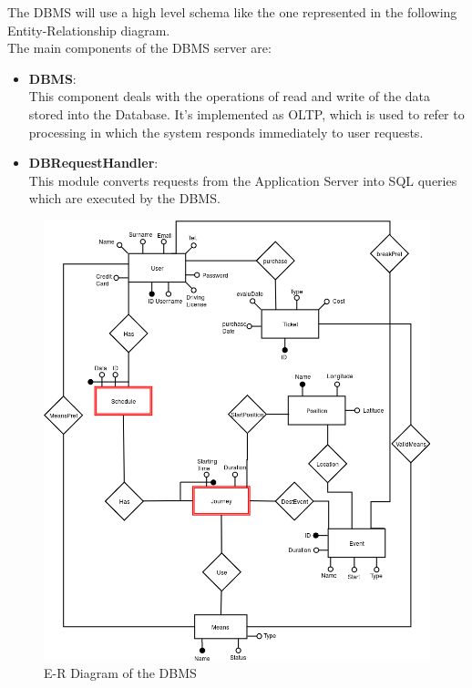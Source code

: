 \documentclass[numbers=noenddot, 12pt, a4paper, oneside]{scrbook}
\begin{document}
The DBMS will use a high level schema like the one represented in the following Entity-Relationship diagram.\\

The main components of the DBMS server are:
\begin{itemize}
	\item \textbf{DBMS}:\\\newline
	This component deals with the operations of read and write of the data stored into the Database. It's implemented as OLTP, which is used to refer to processing in which the system responds immediately to user requests.\\

	\item \textbf{DBRequestHandler}:\\\newline
	This module converts requests from the Application Server into SQL queries which are executed by the DBMS.\\

\end{itemize}



\begin{figure}[H]
	\centering
	\includegraphics[width=1.1\textwidth]{images/ER}
	\caption{E-R Diagram of the DBMS}
\end{figure}
\end{document}
